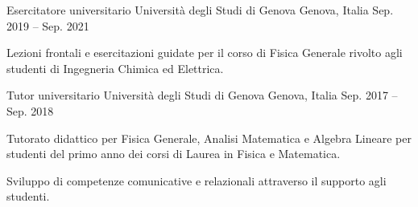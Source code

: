 \begin{cventries}
\cventry
{Esercitatore universitario} %
{Università degli Studi di Genova} %
{Genova, Italia} %
{Sep. 2019 -- Sep. 2021} %
{ %
\begin{cvitems}
\item {Lezioni frontali e esercitazioni guidate per il corso di Fisica Generale rivolto agli studenti di Ingegneria Chimica ed Elettrica.}
\end{cvitems}
}


\cventry
{Tutor universitario} %
{Università degli Studi di Genova} %
{Genova, Italia} %
{Sep. 2017 -- Sep. 2018} %
{ %
\begin{cvitems}
\item {Tutorato didattico per Fisica Generale, Analisi Matematica e Algebra Lineare per studenti del primo anno dei corsi di Laurea in Fisica e Matematica.}
\item {Sviluppo di competenze comunicative e relazionali attraverso il supporto agli studenti.}
\end{cvitems}
}


\end{cventries}